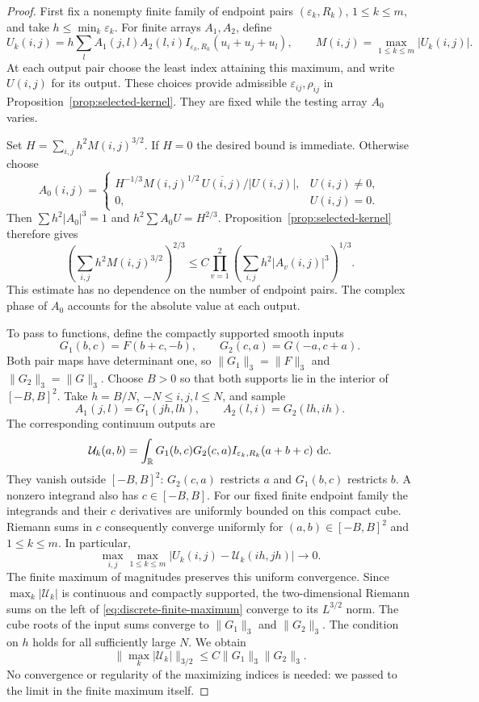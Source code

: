 \begin{proof}
First fix a nonempty finite family of endpoint pairs
$(\varepsilon_k,R_k)$, $1\le k\le m$, and take
$h\le\min_k\varepsilon_k$. For finite arrays $A_1,A_2$, define
\[
 U_k(i,j)=h\sum_l A_1(j,l)A_2(l,i)
                  I_{\varepsilon_k,R_k}(u_i+u_j+u_l),
 \qquad M(i,j)=\max_{1\le k\le m}|U_k(i,j)|.
\]
At each output pair choose the least index attaining this maximum, and
write $U(i,j)$ for its output. These choices provide admissible
$\varepsilon_{ij},\rho_{ij}$ in Proposition~\ref{prop:selected-kernel}.
They are fixed while the testing array $A_0$ varies.

Set $H=\sum_{i,j}h^2 M(i,j)^{3/2}$. If $H=0$ the desired bound is
immediate. Otherwise choose
\[
 A_0(i,j)=
 \begin{cases}
 H^{-1/3}M(i,j)^{1/2}\,\overline{U(i,j)}/|U(i,j)|,
       &U(i,j)\ne0,\\
 0,&U(i,j)=0.
 \end{cases}
\]
Then $\sum h^2|A_0|^3=1$ and $h^2\sum A_0U=H^{2/3}$.
Proposition~\ref{prop:selected-kernel} therefore gives
\begin{equation}\label{eq:discrete-finite-maximum}
 \left(\sum_{i,j}h^2M(i,j)^{3/2}\right)^{2/3}
 \le C\prod_{v=1}^2\left(\sum_{i,j}h^2|A_v(i,j)|^3\right)^{1/3}.
\end{equation}
This estimate has no dependence on the number of endpoint pairs. The
complex phase of $A_0$ accounts for the absolute value at each output.

To pass to functions, define the compactly supported smooth inputs
\[
 G_1(b,c)=F(b+c,-b),\qquad G_2(c,a)=G(-a,c+a).
\]
Both pair maps have determinant one, so
$\|G_1\|_3=\|F\|_3$ and $\|G_2\|_3=\|G\|_3$.
Choose $B>0$ so that both supports lie in the interior of $[-B,B]^2$.
Take $h=B/N$, $-N\le i,j,l\le N$, and sample
\[
 A_1(j,l)=G_1(jh,lh),\qquad A_2(l,i)=G_2(lh,ih).
\]
The corresponding continuum outputs are
\[
 \mathcal U_k(a,b)=\int_\mathbb R G_1(b,c)G_2(c,a)
                         I_{\varepsilon_k,R_k}(a+b+c)\,\mathop{}\!\mathrm d c.
\]
They vanish outside $[-B,B]^2$: $G_2(c,a)$ restricts $a$ and $G_1(b,c)$
restricts $b$. A nonzero integrand also has $c\in[-B,B]$.
For our fixed finite endpoint family the integrands and their $c$
derivatives are uniformly bounded on this compact cube. Riemann sums
in $c$ consequently converge uniformly for $(a,b)\in[-B,B]^2$ and
$1\le k\le m$. In particular,
\[
 \max_{i,j}\max_{1\le k\le m}
       |U_k(i,j)-\mathcal U_k(ih,jh)|\longrightarrow0.
\]
The finite maximum of magnitudes preserves this uniform convergence.
Since $\max_k|\mathcal U_k|$ is continuous and compactly supported,
the two-dimensional Riemann sums on the left of
\eqref{eq:discrete-finite-maximum} converge to its $L^{3/2}$ norm.
The cube roots of the input sums converge to $\|G_1\|_3$ and
$\|G_2\|_3$.
The condition on $h$ holds for all sufficiently large $N$.
We obtain
\[
 \|\max_k|\mathcal U_k|\|_{3/2}\le C\|G_1\|_3\|G_2\|_3.
\]
No convergence or regularity of the maximizing indices is needed: we
passed to the limit in the finite maximum itself.


\end{proof}

